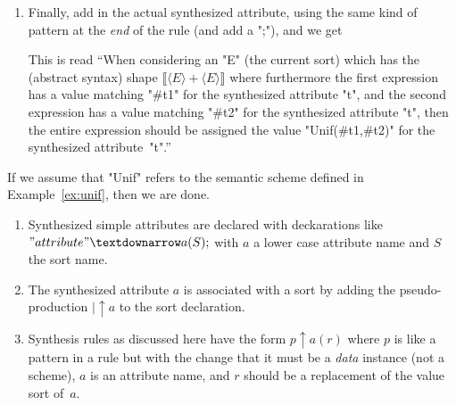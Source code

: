 \documentclass[11pt]{article} %
\begin{document}
\begin{example}
\begin{enumerate}
  \item Finally, add in the actual synthesized attribute, using the same kind of pattern at the
    \emph{end} of the rule (and add a ";"), and we get
    This is read ``When considering an "E" (the current sort) which has the (abstract syntax) shape
    $⟦⟨E⟩+⟨E⟩⟧$ where furthermore the first expression has a value matching "#t1" for the
    synthesized attribute "t", and the second expression has a value matching "#t2" for the
    synthesized attribute "t", then the entire expression should be assigned the value
    "Unif(#t1,#t2)" for the synthesized attribute~"t".''

  \end{enumerate}
  If we assume that "Unif" refers to the semantic scheme defined in Example~\ref{ex:unif}, then we
  are done.
\end{example}

\begin{notation}\leavevmode
  \begin{enumerate}

  \item Synthesized simple attributes are declared with deckarations like $"attribute"↓a(S);$ with
    $a$ a lower case attribute name and $S$ the sort name.

  \item The synthesized attribute $a$ is associated with a sort by adding the pseudo-production
    ${|}↑a$ to the sort declaration.

  \item Synthesis rules as discussed here have the form $p↑a(r)$ where $p$ is like a pattern in a
    rule but with the change that it must be a \emph{data} instance (not a scheme), $a$ is an
    attribute name, and $r$ should be a replacement of the value sort of~$a$.

  \end{enumerate}
\end{notation}
\end{document}
